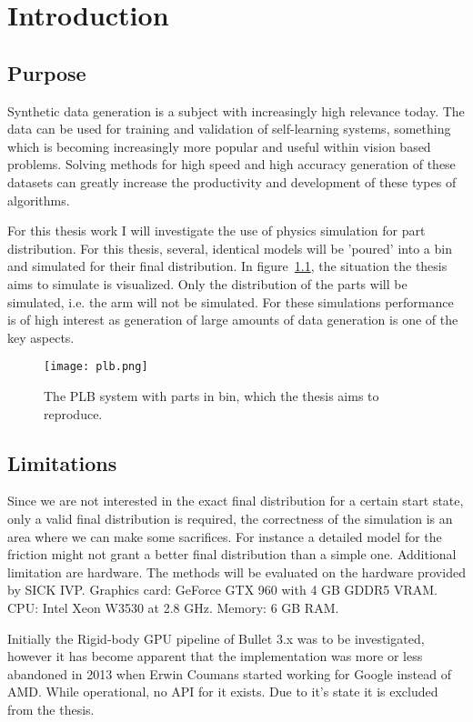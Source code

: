 \chapter{Introduction}\label{cha:intro}

\section{Purpose}

Synthetic data generation is a subject with increasingly high relevance today.
The data can be used for training and validation of self-learning systems,
something which is becoming increasingly more popular and useful within vision
based problems. Solving methods for high speed and high accuracy generation of these datasets
can greatly increase the productivity and development of these
types of algorithms.

For this thesis work I will investigate the use of physics
simulation for part distribution. For this thesis, several, identical models will
be 'poured' into a bin and simulated for their final distribution. In figure~\ref{fig:plb}, the situation
the thesis aims to simulate is visualized. Only the distribution of the parts
will be simulated, i.e. the arm will not be simulated. For these simulations
performance is of high interest as generation of large amounts of data generation
is one of the key aspects.

\begin{figure}[ht]
  \centering
  \texttt{[image: plb.png]}
  \caption{The PLB system with parts in bin, which the thesis aims to reproduce.~\cite{fig:plb}}
  \label{fig:plb}
\end{figure}

\section{Limitations}
Since we are not interested in the exact final distribution for a certain start
state, only a valid final distribution is required, the correctness of the
simulation is an area where we can make some sacrifices. For instance a detailed
model for the friction might not grant a better final distribution than a simple one.
Additional limitation are hardware. The methods will be evaluated on the hardware
provided by SICK IVP. Graphics card: GeForce GTX 960 with 4 GB GDDR5 VRAM.
CPU: Intel Xeon W3530 at 2.8 GHz.
Memory: 6 GB RAM.

Initially the Rigid-body GPU pipeline of Bullet 3.x was to be investigated, however
it has become apparent that the implementation was more or less abandoned in 2013
when Erwin Coumans started working for Google instead of AMD. While operational,
no API for it exists. Due to it's state it is excluded from the thesis.

